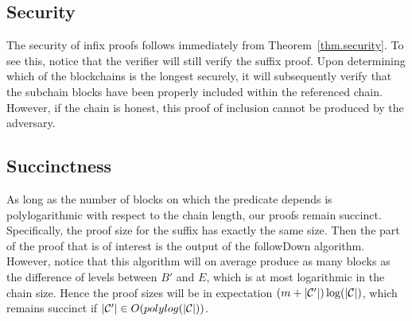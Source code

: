 \subsection{Security}
The security of infix proofs follows immediately from
Theorem~\ref{thm.security}. To see this, notice that the verifier will still
verify the suffix proof. Upon determining which of the blockchains is the
longest securely, it will subsequently verify that the subchain blocks have
been properly included within the referenced chain. However, if the chain is
honest, this proof of inclusion cannot be produced by the adversary.

\subsection{Succinctness}
As long as the number of blocks on which the predicate depends is
polylogarithmic with respect to the chain length, our proofs remain succinct.
Specifically, the proof size for the suffix has exactly the same size. Then
the part of the proof that is of interest is the output of the followDown
algorithm. However, notice that this algorithm will on average produce as many
blocks as the difference of levels between $B'$ and $E$, which is at most
logarithmic in the chain size. Hence the proof sizes will be in expectation
$(m + |\mathcal{C}'|)\log(|\mathcal{C}|)$, which remains succinct if $|\mathcal{C}'| \in
O(polylog(|\mathcal{C}|))$.
